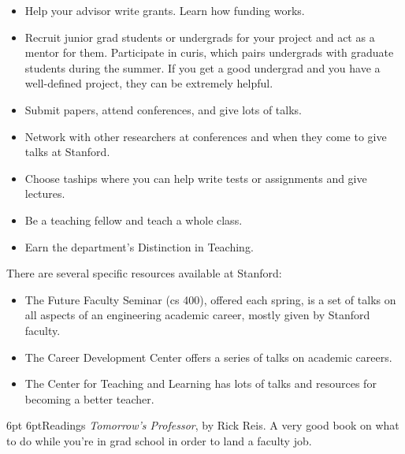 \documentclass[10pt]{book}
\makeatletter
\renewcommand{\subsection}{\@startsection{subsection}{2}{0mm}%
   {6pt}%
   {6pt}{\normalfont\normalsize\itshape}}
\makeatother
\begin{document}
\begin{itemize}
\item Help your advisor write grants.  Learn how funding works.
\item Recruit junior grad students or undergrads for your project and act as a
mentor for them. Participate in {\sc curis}, which pairs
undergrads with graduate students during the summer. If you get a good
undergrad and you have a well-defined project, they can be extremely helpful.

\item Submit papers, attend conferences, and give lots of talks.

\item Network with other researchers at conferences and when they come to give
talks at Stanford.

\item Choose {\sc ta}ships where you can help write tests or assignments and
give lectures.

\item Be a teaching fellow and teach a whole class.

\item Earn the department's Distinction in Teaching.
\end{itemize}

There are several specific resources available at Stanford:

\begin{itemize}
\item The Future Faculty Seminar ({\sc cs} 400), offered each spring, is a set of
talks on all aspects of an engineering academic career, mostly given by
Stanford faculty.

\item The Career Development Center offers a series of talks on academic
careers.

\item The Center for Teaching and Learning has lots of talks and resources for
becoming a better teacher.
\end{itemize}

\subsection{Readings}
{\it Tomorrow's Professor}, by Rick Reis. A very good book on what to do while
you're in grad school in order to land a faculty job.
\end{document}
